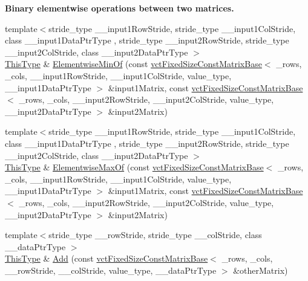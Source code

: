 \begin{Indent}{\bf Binary elementwise operations between two matrices.}
\begin{DoxyCompactItemize}
{\footnotesize template$<$stride\+\_\+type \+\_\+\+\_\+input1\+Row\+Stride, stride\+\_\+type \+\_\+\+\_\+input1\+Col\+Stride, class \+\_\+\+\_\+input1\+Data\+Ptr\+Type , stride\+\_\+type \+\_\+\+\_\+input2\+Row\+Stride, stride\+\_\+type \+\_\+\+\_\+input2\+Col\+Stride, class \+\_\+\+\_\+input2\+Data\+Ptr\+Type $>$ }\\\hyperlink{classvct_fixed_size_const_matrix_base_a7ec66a96ed7e08ce9ff54093133c9d8d}{This\+Type} \& \hyperlink{classvct_fixed_size_matrix_base_aeab7d339ee3999ce62c162e1989425c2}{Elementwise\+Min\+Of} (const \hyperlink{classvct_fixed_size_const_matrix_base}{vct\+Fixed\+Size\+Const\+Matrix\+Base}$<$ \+\_\+rows, \+\_\+cols, \+\_\+\+\_\+input1\+Row\+Stride, \+\_\+\+\_\+input1\+Col\+Stride, value\+\_\+type, \+\_\+\+\_\+input1\+Data\+Ptr\+Type $>$ \&input1\+Matrix, const \hyperlink{classvct_fixed_size_const_matrix_base}{vct\+Fixed\+Size\+Const\+Matrix\+Base}$<$ \+\_\+rows, \+\_\+cols, \+\_\+\+\_\+input2\+Row\+Stride, \+\_\+\+\_\+input2\+Col\+Stride, value\+\_\+type, \+\_\+\+\_\+input2\+Data\+Ptr\+Type $>$ \&input2\+Matrix)
\item 
{\footnotesize template$<$stride\+\_\+type \+\_\+\+\_\+input1\+Row\+Stride, stride\+\_\+type \+\_\+\+\_\+input1\+Col\+Stride, class \+\_\+\+\_\+input1\+Data\+Ptr\+Type , stride\+\_\+type \+\_\+\+\_\+input2\+Row\+Stride, stride\+\_\+type \+\_\+\+\_\+input2\+Col\+Stride, class \+\_\+\+\_\+input2\+Data\+Ptr\+Type $>$ }\\\hyperlink{classvct_fixed_size_const_matrix_base_a7ec66a96ed7e08ce9ff54093133c9d8d}{This\+Type} \& \hyperlink{classvct_fixed_size_matrix_base_aaad8b456c62564f71e5c1528fb9de2fa}{Elementwise\+Max\+Of} (const \hyperlink{classvct_fixed_size_const_matrix_base}{vct\+Fixed\+Size\+Const\+Matrix\+Base}$<$ \+\_\+rows, \+\_\+cols, \+\_\+\+\_\+input1\+Row\+Stride, \+\_\+\+\_\+input1\+Col\+Stride, value\+\_\+type, \+\_\+\+\_\+input1\+Data\+Ptr\+Type $>$ \&input1\+Matrix, const \hyperlink{classvct_fixed_size_const_matrix_base}{vct\+Fixed\+Size\+Const\+Matrix\+Base}$<$ \+\_\+rows, \+\_\+cols, \+\_\+\+\_\+input2\+Row\+Stride, \+\_\+\+\_\+input2\+Col\+Stride, value\+\_\+type, \+\_\+\+\_\+input2\+Data\+Ptr\+Type $>$ \&input2\+Matrix)
\item 
{\footnotesize template$<$stride\+\_\+type \+\_\+\+\_\+row\+Stride, stride\+\_\+type \+\_\+\+\_\+col\+Stride, class \+\_\+\+\_\+data\+Ptr\+Type $>$ }\\\hyperlink{classvct_fixed_size_const_matrix_base_a7ec66a96ed7e08ce9ff54093133c9d8d}{This\+Type} \& \hyperlink{classvct_fixed_size_matrix_base_abce988ebeb16300e57b94545d0cedc34}{Add} (const \hyperlink{classvct_fixed_size_const_matrix_base}{vct\+Fixed\+Size\+Const\+Matrix\+Base}$<$ \+\_\+rows, \+\_\+cols, \+\_\+\+\_\+row\+Stride, \+\_\+\+\_\+col\+Stride, value\+\_\+type, \+\_\+\+\_\+data\+Ptr\+Type $>$ \&other\+Matrix)

\end{DoxyCompactItemize}
\end{Indent}

